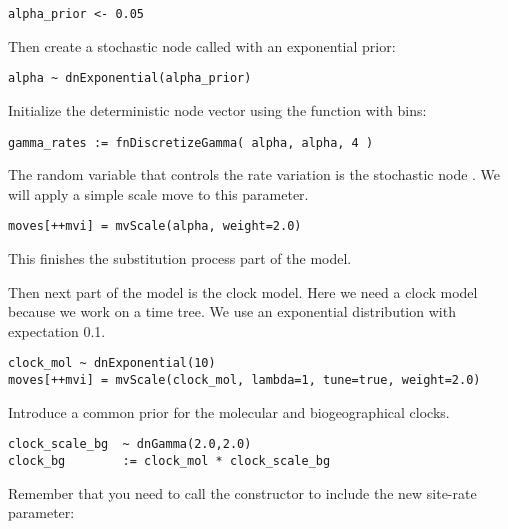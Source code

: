 {\tt\begin{snugshade*}
\begin{lstlisting}
alpha_prior <- 0.05                                                                             
\end{lstlisting}
\end{snugshade*}}
Then create a stochastic node called  with an exponential prior:
{\tt\begin{snugshade*}
\begin{lstlisting}
alpha ~ dnExponential(alpha_prior)
\end{lstlisting}
\end{snugshade*}}
Initialize the  deterministic node vector using the   function with  bins:
{\tt \begin{snugshade*}
\begin{lstlisting}
gamma_rates := fnDiscretizeGamma( alpha, alpha, 4 )
\end{lstlisting}
\end{snugshade*}}
The random variable that controls the rate variation is the stochastic node . 
We will apply a simple scale move to this parameter.
{\tt \begin{snugshade*}
\begin{lstlisting}
moves[++mvi] = mvScale(alpha, weight=2.0)
\end{lstlisting}
\end{snugshade*}}
This finishes the substitution process part of the model.

Then next part of the model is the clock model. Here we need a clock model because we work on a time tree. We use an exponential distribution with expectation 0.1.
{\tt \begin{snugshade*}
\begin{lstlisting}
clock_mol ~ dnExponential(10)
moves[++mvi] = mvScale(clock_mol, lambda=1, tune=true, weight=2.0)
\end{lstlisting}
\end{snugshade*}}

Introduce a common prior for the molecular and biogeographical clocks.
\begin{snugshade}
\begin{lstlisting}
clock_scale_bg  ~ dnGamma(2.0,2.0)
clock_bg        := clock_mol * clock_scale_bg
\end{lstlisting}
\end{snugshade}

Remember that you need to call the  constructor to include the new site-rate parameter:

